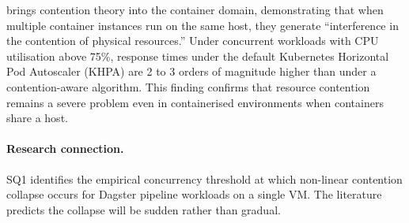 \citet{casalicchio2019} brings contention theory into the container domain, demonstrating that when multiple container instances run on the same host, they generate ``interference in the contention of physical resources.'' Under concurrent workloads with CPU utilisation above 75\%, response times under the default Kubernetes Horizontal Pod Autoscaler (KHPA) are 2 to 3 orders of magnitude higher than under a contention-aware algorithm. This finding confirms that resource contention remains a severe problem even in containerised environments when containers share a host.

\paragraph{Research connection.}
SQ1 identifies the empirical concurrency threshold at which non-linear contention collapse occurs for Dagster pipeline workloads on a single VM. The literature predicts the collapse will be sudden rather than gradual.

